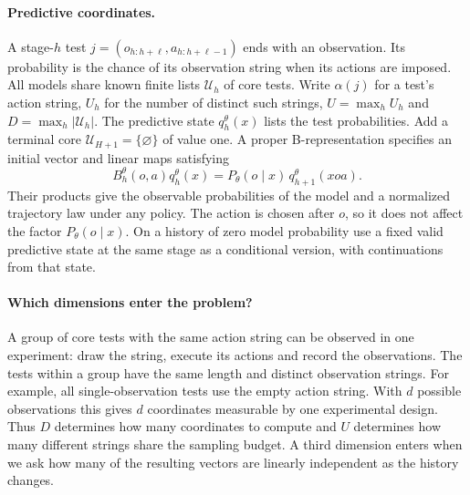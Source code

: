 \documentclass[sigconf,nonacm]{acmart}
\newcommand{\U}{\mathcal U}
\begin{document}
\paragraph{Predictive coordinates.}
A stage-$h$ test $j=(o_{h:h+\ell},a_{h:h+\ell-1})$ ends with an observation. Its probability is the chance of its observation string when its actions are imposed. All models share known finite lists $\U_h$ of core tests. Write $\alpha(j)$ for a test's action string, $U_h$ for the number of distinct such strings, $U=\max_h U_h$ and $D=\max_h|\U_h|$. The predictive state $q_h^\theta(x)$ lists the test probabilities. Add a terminal core $\U_{H+1}=\{\varnothing\}$ of value one. A proper B-representation specifies an initial vector and linear maps satisfying
\begin{equation}
 B_h^\theta(o,a)q_h^\theta(x)=
 P_\theta(o\mid x)\,q_{h+1}^\theta(xoa).
 \label{eq:update}
\end{equation}
Their products give the observable probabilities of the model and a normalized trajectory law under any policy. The action is chosen after $o$, so it does not affect the factor $P_\theta(o\mid x)$. On a history of zero model probability use a fixed valid predictive state at the same stage as a conditional version, with continuations from that state.

\paragraph{Which dimensions enter the problem?}
A group of core tests with the same action string can be observed in one experiment: draw the string, execute its actions and record the observations. The tests within a group have the same length and distinct observation strings. For example, all single-observation tests use the empty action string. With $d$ possible observations this gives $d$ coordinates measurable by one experimental design. Thus $D$ determines how many coordinates to compute and $U$ determines how many different strings share the sampling budget. A third dimension enters when we ask how many of the resulting vectors are linearly independent as the history changes.
\end{document}
